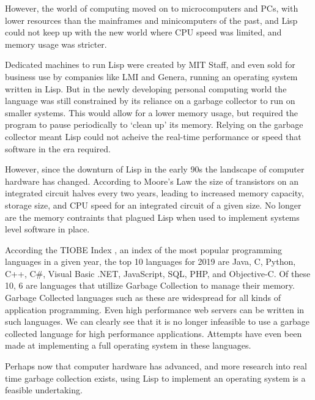 \documentclass{article}
\begin{document}
  However, the world of computing moved on to microcomputers and PCs, with lower resources than the mainframes and minicomputers of the past, and Lisp could not keep up with the new world where CPU speed was limited, and memory usage was stricter.
  \par
  
  Dedicated machines to run Lisp were created by MIT Staff\cite{knight-lisp}, and even sold for business use by companies like LMI and Genera, running an operating system written in Lisp. But in the newly developing personal computing world the language was still constrained by its reliance on a garbage collector to run on smaller systems. This would allow for a lower memory usage, but required the program to pause periodically to `clean up' its memory. Relying on the garbage collector meant Lisp could not acheive the real-time performance or speed that software in the era required.
  \par
  
  However, since the downturn of Lisp in the early 90s the landscape of computer hardware has changed. According to Moore's Law the size of transistors on an integrated circuit halves every two years, leading to increased memory capacity, storage size, and CPU speed for an integrated circuit of a given size. No longer are the memory contraints that plagued Lisp when used to implement systems level software in place.
  \par
  
  According the TIOBE Index \cite{tiobe-index}, an index of the most popular programming languages in a given year, the top 10 languages for 2019 are Java, C, Python, C++, C\#, Visual Basic .NET, JavaScript, SQL, PHP, and Objective-C. Of these 10, 6 are languages that utillize Garbage Collection to manage their memory. Garbage Collected languages such as these are widespread for all kinds of application programming. Even high performance web servers can be written in such languages. We can clearly see that it is no longer infeasible to use a garbage collected language for high performance applications. Attempts have even been made at implementing a full operating system in these languages.
  \par
  
  Perhaps now that computer hardware has advanced, and more research into real time garbage collection exists, using Lisp to implement an operating system is a feasible undertaking.
\end{document}
